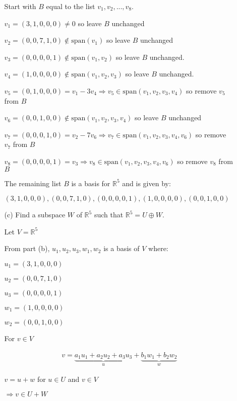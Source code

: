 \documentclass[fleqn]{article}
\begin{document}
\begin{enumerate}[nolistsep]
\begin{enumerate}[nolistsep]
				Start with $B$ equal to the list $v_1, v_2, ..., v_8$.
				
				$v_1 = (3, 1, 0, 0, 0) \neq 0$ so leave $B$ unchanged
				
				$v_2 = (0, 0, 7, 1, 0) \not\in \text{span}(v_1)$ so leave $B$ unchanged
				
				$v_3 = (0, 0, 0, 0, 1) \not\in \text{span}(v_1, v_2)$ so leave $B$ unchanged.
				
				$v_4 = (1, 0, 0, 0, 0) \not\in \text{span}(v_1, v_2, v_3)$ so leave $B$ unchanged.
				
				$v_5 = (0, 1, 0, 0, 0) = v_1 - 3v_4 \Rightarrow v_5 \in \text{span}(v_1, v_2, v_3, v_4)$ so remove $v_5$ from $B$
				
				$v_6 = (0, 0, 1, 0, 0) \not\in \text{span}(v_1, v_2, v_3, v_4)$ so leave $B$ unchanged
				
				$v_7 = (0, 0, 0, 1, 0) = v_2 - 7v_6 \Rightarrow v_7 \in \text{span}(v_1, v_2, v_3, v_4, v_6)$ so remove $v_7$ from $B$
				
				$v_8 = (0, 0, 0, 0, 1) = v_3 \Rightarrow v_8 \in \text{span}(v_1, v_2, v_3, v_4, v_6)$ so remove $v_8$ from $B$
				 
				The remaining list $B$ is a basis for $\mathbb{R}^5$ and is given by:
				
				$(3, 1, 0, 0, 0), (0, 0, 7, 1, 0), (0, 0, 0, 0, 1), (1, 0, 0, 0, 0), (0, 0, 1, 0, 0)$
					
				\item[(c)] Find a subspace $W$ of $\mathbb{R}^5$ such that $\mathbb{R}^5 = U \oplus W$.
				
				Let $V = \mathbb{R}^5$
				
				From part (b), $u_1, u_2, u_3, w_1, w_2$ is a basis of $V$ where:
				
				$u_1 = (3, 1, 0, 0, 0)$
				
				$u_2 = (0, 0, 7, 1, 0)$
				
				$u_3 = (0, 0, 0, 0, 1)$
				
				$w_1 = (1, 0, 0, 0, 0)$
				
				$w_2 = (0, 0, 1, 0, 0)$
				
				For $v \in V$
				
				\begin{align*}
				v = \underbrace{a_1u_1 + a_2u_2 + a_3u_3}_{u} + \underbrace{b_1w_1 + b_2w_2}_{w}
				\end{align*}
				
				$v = u + w$ for $u \in U$ and $v \in V$
				
				$\Rightarrow v \in U + W$
				

\end{enumerate}
\end{enumerate}
\end{document}
